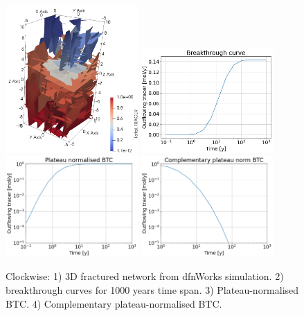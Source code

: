 \documentclass{article}
\begin{document}
\begin{figure}[htbp!]
    \centering
    \includegraphics[width=0.45\textwidth]{images/dfnWorksImages/3DdfnDiffEugV6.png}
    \hspace{0.05\textwidth}
    \includegraphics[width=0.45\textwidth]{images/dfnWorksImages/btcFrom3DeugV6.png}
    \vspace{0.05\textwidth}
    \includegraphics[width=0.45\textwidth]{images/dfnWorksImages/btcFrom3DeugV6norm.png}
    \hspace{0.05\textwidth}
    \includegraphics[width=0.45\textwidth]{images/dfnWorksImages/complementaryBtcFrom3DeugV6norm.png}
    \caption{Clockwise: 1) 3D fractured network from dfnWorks simulation. 2) breakthrough curves for 1000 years time span. 3) Plateau-normalised BTC. 4) Complementary plateau-normalised BTC.}
    \label{fig:3DdfnWorksEugV6}
\end{figure}
\end{document}
